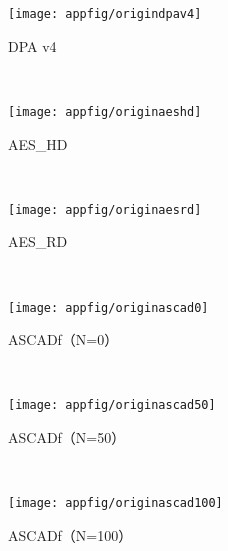 {	\begin{appfig}[!htb]
		\centering
		\begin{subfigure}[b]{\trif\textwidth}
			\texttt{[image: appfig/origindpav4]}
			\caption{DPA v4}
			\label{fig:origindpav4}
		\end{subfigure}%
		~%
		\begin{subfigure}[b]{\trif\textwidth}
			\texttt{[image: appfig/originaeshd]}
			\caption{AES\_HD}
			\label{fig:originaeshd}
		\end{subfigure}
		~%
		\begin{subfigure}[b]{\trif\textwidth}
			\texttt{[image: appfig/originaesrd]}
			\caption{AES\_RD}
			\label{fig:originaesrd}
		\end{subfigure}
		\\%
		\begin{subfigure}[b]{\trif\textwidth}
			\texttt{[image: appfig/originascad0]}
			\caption{ASCADf（N=0）}
			\label{fig:originascad0}
		\end{subfigure}%
		~%
		\begin{subfigure}[b]{\trif\textwidth}
			\texttt{[image: appfig/originascad50]}
			\caption{ASCADf（N=50）}
			\label{fig:originascad50}
		\end{subfigure}
		~%
		\begin{subfigure}[b]{\trif\textwidth}
			\texttt{[image: appfig/originascad100]}
			\caption{ASCADf（N=100）}
			\label{fig:originascad100}
		\end{subfigure}
		\\%
		\label{appfig:origindlsca}
	\end{appfig}
	
}
